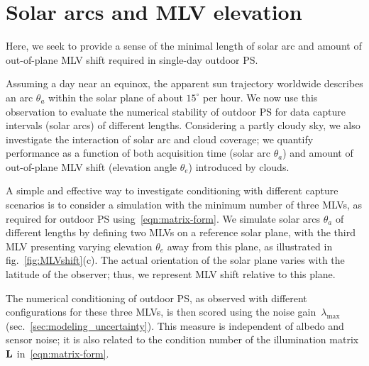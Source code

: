 

\section{Solar arcs and MLV elevation}
\label{subsec:solararcs-mlvelevation}


Here, we seek to provide a sense of the minimal length of solar arc and amount of out-of-plane MLV shift required in single-day outdoor PS.

Assuming a day near an equinox, the apparent sun trajectory worldwide describes an arc $\theta_a$ within the solar plane of about $15^\circ$ per hour. We now use this observation to evaluate the numerical stability of outdoor PS for data capture intervals (solar arcs) of different lengths. Considering a partly cloudy sky, we also investigate the interaction of solar arc and cloud coverage; we quantify performance as a function of both acquisition time (solar arc $\theta_a$) and amount of out-of-plane MLV shift (elevation angle $\theta_e$) introduced by clouds.

A simple and effective way to investigate conditioning with different capture scenarios is to consider a simulation with the minimum number of three MLVs, as required for outdoor PS using~\eqref{eqn:matrix-form}. We simulate solar arcs $\theta_a$ of different lengths by defining two MLVs on a reference solar plane, with the third MLV presenting varying elevation $\theta_e$ away from this plane, as illustrated in fig.~\ref{fig:MLVshift}(c). The actual orientation of the solar plane varies with the latitude of the observer; thus, we represent MLV shift relative to this plane.

The numerical conditioning of outdoor PS, as observed with different configurations for these three MLVs, is then scored using the noise gain~$\lambda_{\max}$ (sec.~\ref{sec:modeling_uncertainty}). This measure is independent of albedo and sensor noise; it is also related to the condition number of the illumination matrix ${\bf L}$ in~\eqref{eqn:matrix-form}.

